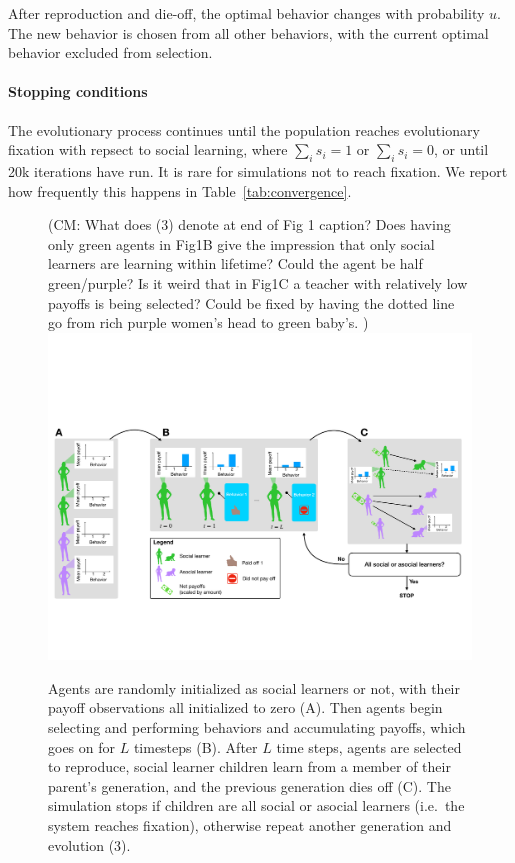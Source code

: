 \documentclass[letterpaper,11.5pt]{scrartcl}
\newcommand{\cm}[1]{{\textcolor{mypurple} {({\tiny CM:} #1)}}}
\begin{document}
After reproduction and die-off, the optimal behavior changes with probability
$u$. The new behavior is chosen from all other behaviors, with the 
current optimal behavior excluded from selection.

\paragraph{Stopping conditions} The evolutionary process continues until the
population reaches evolutionary fixation with repsect to social learning, where
$\sum_i s_i = 1$ or $\sum_i s_i = 0$, or until 20k iterations have run. 
It is rare for simulations not to reach fixation. We report how frequently
this happens in Table~\ref{tab:convergence}. 

\clearpage

\begin{figure}
  \caption{Agents are randomly initialized as social learners or not, with their
  payoff observations all initialized to zero (A). Then agents begin selecting
and performing behaviors and accumulating payoffs, which goes on for $L$
timesteps (B). After $L$ time steps, agents are selected to reproduce,
social learner children learn from a member of their parent's generation, and
the previous generation dies off (C). The simulation stops if children are all
social or asocial learners (i.e.\ the system reaches fixation), 
otherwise repeat another generation and evolution (3).} \cm{What does (3) denote at end of Fig 1 caption? Does having only green agents in Fig1B give the impression that only social learners are learning within lifetime? Could the agent be half green/purple? Is it weird that in Fig1C a teacher with relatively low payoffs is being selected? Could be fixed by having the dotted line go from rich purple women's head to green baby's. }
  \label{fig:schematic}
  \centering
    \includegraphics[width=\textwidth]{Figures/IntraInterGenerationalDynamics.pdf}
\end{figure}
\end{document}
